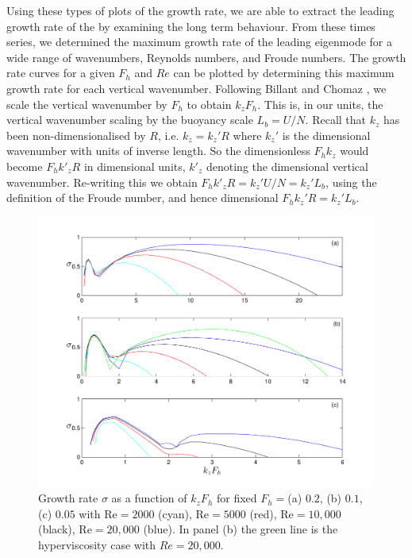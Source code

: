 Using these types of plots of the growth rate, we are able to extract the leading growth rate of the  by examining the long term behaviour. From these times series, we determined the maximum growth rate of the leading eigenmode for a wide range of wavenumbers, Reynolds numbers, and Froude numbers. The growth rate curves for a given $F_{h}$ and $Re$ can be plotted by determining this maximum growth rate for each vertical wavenumber. Following Billant and Chomaz \cite{bc2000c}, we scale the vertical wavenumber by $F_{h}$ to obtain  $k_{z}F_{h}$.  This is, in our units, the vertical wavenumber scaling by the buoyancy scale $L_{b} = U/N$. Recall that $k_{z}$ has been non-dimensionalised by $R$, i.e. $k_{z}= k_{z}'R$ where $k_{z}'$ is the dimensional wavenumber with units of inverse length. So the dimensionless $F_{h}k_{z}$ would become $F_{h}k'_{z}R$ in dimensional units, $k'_{z}$ denoting the dimensional vertical wavenumber. Re-writing this we obtain $F_{h}k'_{z}R=k_{z}'U/N=k_{z}'L_{b}$, using the definition of the Froude number, and hence dimensional $F_{h}k_{z}'R=k_{z}'L_{b}$.

\begin{figure}
\begin{center}
\includegraphics[width=\textwidth]{fixed_froude_varying_reynolds}
\caption{Growth rate $\sigma$ as a function of $k_{z}F_{h}$ for fixed $F_{h}=$(a) $0.2$, (b) $0.1$, (c) $0.05$ with Re$=2000$ (cyan), Re$=5000$ (red), Re$=10{,}000$ (black), Re$=20{,}000$ (blue). In panel (b) the green line is the hyperviscosity case with $Re=20{,}000$.}
\label{FixFhVaryRe}
\end{center}
\end{figure}

